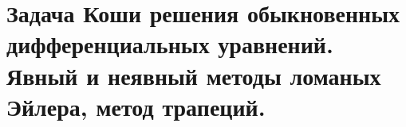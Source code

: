 \documentclass[../../calc-math-exam-2023.tex]{subfiles}
\begin{document}
    \section{Задача Коши решения обыкновенных дифференциальных уравнений. Явный и неявный методы ломаных Эйлера, метод трапеций.}\label{sec:ch24}
\end{document}
